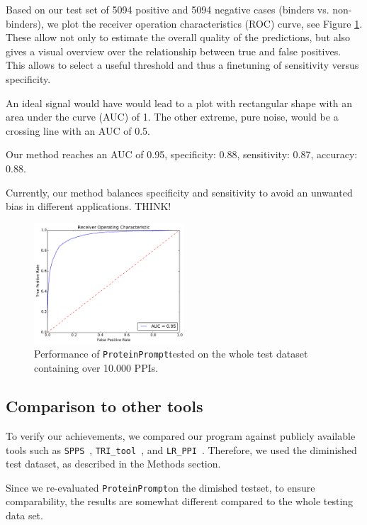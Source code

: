 \documentclass[preprint,3p,times,twocolumn]{elsarticle}
\newcommand{\TODO}[1] {\begingroup\color{red}#1\endgroup}
\newcommand{\spps}{\texttt{SPPS}}
\newcommand{\tri}{\texttt{TRI\_tool}}
\newcommand{\lr}{\texttt{LR\_PPI}}
\newcommand{\tool}{\texttt{ProteinPrompt}\hspace{2pt}}
\begin{document}
Based on our test set of 5094 positive and 5094 negative cases
(binders vs. non-binders), we plot the receiver operation
characteristics (ROC) curve, see Figure \ref{fig:roc}. These allow not
only to estimate the overall quality of the predictions, but also
gives a visual overview over the relationship between true and false
positives. This allows to select a useful threshold and thus a
finetuning of sensitivity versus specificity.

An ideal signal would have would lead to a plot with rectangular shape
with an area under the curve (AUC) of 1. The other extreme, pure noise, would be a crossing
line with an AUC of 0.5.

Our method reaches an AUC of 0.95,
specificity: 0.88,
sensitivity: 0.87,
accuracy: 0.88.

Currently, our method balances specificity and sensitivity to avoid an
unwanted bias in different applications. \TODO{THINK!} 

\begin{figure}[t]
\includegraphics[width=0.5\textwidth]{img/meta_final_roc.pdf}
\caption{Performance of \tool tested on the whole test dataset
  containing over 10.000 PPIs.}
\label{fig:roc}
\end{figure} 



\subsection{Comparison to other tools}

To verify our achievements, we compared our program against publicly
available tools such as \spps\ \cite{Liu:2012}, \tri\
\cite{Perovic:2017}, and \lr\ \cite{Pan:2010}. Therefore, we used the
diminished test dataset, as described in the Methods section. 

Since we re-evaluated \tool on the dimished testset, to ensure
comparability, the results are somewhat different compared to the
whole testing data set. 
\end{document}
